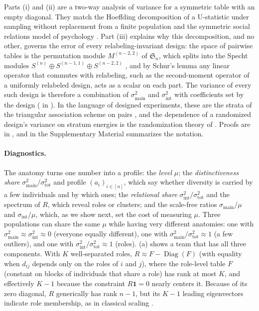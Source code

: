 \documentclass[twoside,11pt]{article}
\newcommand{\sigmamain}{\sigma^2_{\mathrm{main}}}
\newcommand{\sigmaint}{\sigma^2_{\mathrm{int}}}
\newcommand{\sigmatot}{\sigma^2_{\mathrm{tot}}}
\newcommand{\one}{\mathbf{1}}
\newcommand{\Sym}{\mathfrak{S}}
\begin{document}
Parts (i) and (ii) are a two-way analysis of variance for a symmetric table
with an empty diagonal. They match the Hoeffding decomposition of a
U-statistic under sampling without replacement from a finite population \citep{nandi1963properties,bloznelis2001orthogonal}
and the symmetric social relations model of psychology
\citep{kenny1984social}. Part (iii) explains why this decomposition, and no
other, governs the error of every relabeling-invariant design: the space of
pairwise tables is the permutation module $M^{(n-2,2)}$ of $\Sym_n$, which
splits into the Specht modules $S^{(n)}\oplus S^{(n-1,1)}\oplus S^{(n-2,2)}$
\citep{james1978representation,diaconis1988group}, and by Schur's lemma any
linear operator that commutes with relabeling, such as the second-moment
operator of a uniformly relabeled design, acts as a scalar on each part. The
variance of every such design is therefore a combination of $\sigmamain$
and $\sigmaint$ with coefficients set by the design
( in ). In the
language of designed experiments, these are the strata of the triangular
association scheme on pairs \citep{bose1952classification}, and the
dependence of a randomized design's variance on stratum energies is the
randomization theory of \citet{bailey1991strata,bailey2004association}.
Proofs are in , and  in the
Supplementary Material summarizes the notation.

\paragraph{Diagnostics.}
The anatomy turns one number into a profile: the \emph{level} $\mu$; the
\emph{distinctiveness share} $\sigmamain/\sigmatot$ and profile
$(a_i)_{i\in[n]}$, which say whether diversity is carried by a few
individuals and by which ones; the \emph{relational share}
$\sigmaint/\sigmatot$ and the spectrum of $R$, which reveal roles or
clusters; and the scale-free ratios $\sigma_{\mathrm{main}}/\mu$ and
$\sigma_{\mathrm{int}}/\mu$, which, as we show next, set the cost of
measuring $\mu$. Three populations can share the same $\mu$ while having very different anatomies:
one with ${\sigmamain\approx\sigmaint\approx 0}$ (everyone equally
different), one with $\sigmamain/\sigmatot\approx 1$ (a few outliers), and
one with $\sigmaint/\sigmatot\approx 1$ (roles). (a) shows
a team that has all three components. With $K$ well-separated roles,
${R\approx F-\operatorname{Diag}(F)}$ (with equality when $d_{ij}$ depends only on
the roles of $i$ and $j$), where the role-level table $F$ (constant
on blocks of individuals that share a role) has rank at most $K$, and
effectively $K-1$ because the constraint $R\one=0$ nearly centers it.
Because of its zero diagonal, $R$ generically has rank $n-1$, but its
$K-1$ leading eigenvectors indicate role membership, as in classical
scaling \citep{torgerson1952multidimensional,gower1966some}.
\end{document}
